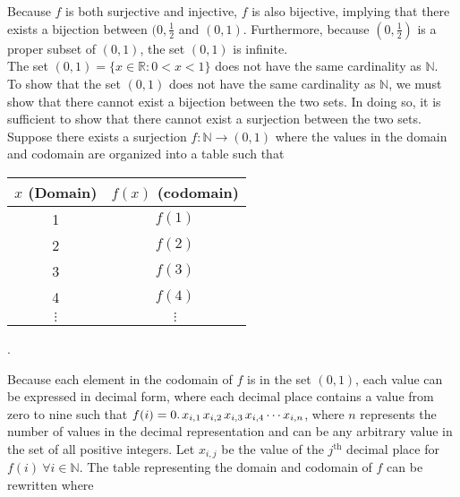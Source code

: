 \documentclass{article}
\begin{document}
\\ \\
Because $f$ is both surjective and injective, $f$ is also bijective, implying that there exists a bijection between $(0,\frac{1}{2}$ and $(0,1)$.  Furthermore, because $(0,\frac{1}{2})$ is a proper subset of $(0,1)$, the set $(0,1)$ is infinite.
\\[0.1in]  The set $(0,1) = \{x \in \mathbb{R}: 0 < x < 1 \}$ does not have the same cardinality as $\mathbb{N}$.
\\[0.05in]  To show that the set $(0,1)$ does not have the same cardinality as $\mathbb{N}$, we must show that there cannot exist a bijection between the two sets. In doing so, it is sufficient to show that there cannot exist a surjection between the two sets. Suppose there exists a surjection $f: \mathbb{N} \rightarrow (0,1)$ where the values in the domain and codomain are organized into a table such that 
\begin{center}\begin{tabular}{c|c}
	$x$ (Domain) & $f(x)$ (codomain) \\ \hline
	1 & $ f(1)$ \\
	2 & $ f(2)$ \\
	3 & $ f(3)$ \\
	4 & $ f(4)$ \\
	$\vdots$ & $\vdots$ \\
\end{tabular}.\end{center}
Because each element in the codomain of $f$ is in the set $(0,1)$, each value can be expressed in decimal form, where each decimal place contains a value from zero to nine such that $f(i) = 0.\hspace{0.02in} x_{i,1} \hspace{0.02in} x_{i,2} \hspace{0.02in} x_{i,3}\hspace{0.02in}x_{i,4}\cdots x_{i,n}$, where $n$ represents the number of values in the decimal representation and can be any arbitrary value in the set of all positive integers. Let $x_{i,j}$ be the value of the $j^{\text{th}}$ decimal place for $f(i) \ \forall i \in \mathbb{N}$. The table representing the domain and codomain of $f$ can be rewritten where
\end{document}
